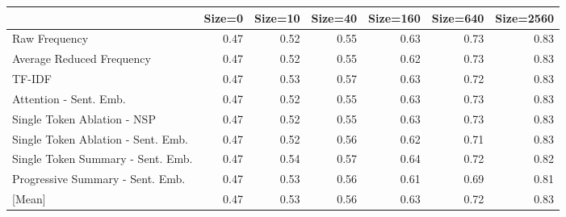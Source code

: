 \begin{tabular}{lrrrrrr}
\toprule
 & Size=0 & Size=10 & Size=40 & Size=160 & Size=640 & Size=2560 \\
\midrule
Raw Frequency & \cellcolor[RGB]{58,76,192}0.47 & \cellcolor[RGB]{101,134,236}0.52 & \cellcolor[RGB]{130,165,251}0.55 & \cellcolor[RGB]{205,217,236}0.63 & \cellcolor[RGB]{246,164,134}0.73 & \cellcolor[RGB]{179,3,38}0.83 \\
Average Reduced Frequency & \cellcolor[RGB]{58,76,192}0.47 & \cellcolor[RGB]{101,134,236}0.52 & \cellcolor[RGB]{130,165,251}0.55 & \cellcolor[RGB]{197,213,242}0.62 & \cellcolor[RGB]{246,164,134}0.73 & \cellcolor[RGB]{179,3,38}0.83 \\
TF-IDF & \cellcolor[RGB]{58,76,192}0.47 & \cellcolor[RGB]{111,145,242}0.53 & \cellcolor[RGB]{151,184,254}0.57 & \cellcolor[RGB]{205,217,236}0.63 & \cellcolor[RGB]{247,174,145}0.72 & \cellcolor[RGB]{179,3,38}0.83 \\
Attention - Sent. Emb. & \cellcolor[RGB]{58,76,192}0.47 & \cellcolor[RGB]{101,134,236}0.52 & \cellcolor[RGB]{130,165,251}0.55 & \cellcolor[RGB]{205,217,236}0.63 & \cellcolor[RGB]{246,164,134}0.73 & \cellcolor[RGB]{179,3,38}0.83 \\
Single Token Ablation - NSP & \cellcolor[RGB]{58,76,192}0.47 & \cellcolor[RGB]{101,134,236}0.52 & \cellcolor[RGB]{130,165,251}0.55 & \cellcolor[RGB]{205,217,236}0.63 & \cellcolor[RGB]{246,164,134}0.73 & \cellcolor[RGB]{179,3,38}0.83 \\
Single Token Ablation - Sent. Emb. & \cellcolor[RGB]{58,76,192}0.47 & \cellcolor[RGB]{101,134,236}0.52 & \cellcolor[RGB]{141,175,253}0.56 & \cellcolor[RGB]{197,213,242}0.62 & \cellcolor[RGB]{246,183,156}0.71 & \cellcolor[RGB]{179,3,38}0.83 \\
Single Token Summary - Sent. Emb. & \cellcolor[RGB]{58,76,192}0.47 & \cellcolor[RGB]{120,155,247}0.54 & \cellcolor[RGB]{151,184,254}0.57 & \cellcolor[RGB]{213,219,229}0.64 & \cellcolor[RGB]{247,174,145}0.72 & \cellcolor[RGB]{190,35,45}0.82 \\
Progressive Summary - Sent. Emb. & \cellcolor[RGB]{58,76,192}0.47 & \cellcolor[RGB]{111,145,242}0.53 & \cellcolor[RGB]{141,175,253}0.56 & \cellcolor[RGB]{188,209,246}0.61 & \cellcolor[RGB]{242,199,178}0.69 & \cellcolor[RGB]{200,56,53}0.81 \\
\midrule
{[Mean]} & \cellcolor[RGB]{58,76,192}0.47 & \cellcolor[RGB]{107,141,240}0.53 & \cellcolor[RGB]{138,173,253}0.56 & \cellcolor[RGB]{202,216,238}0.63 & \cellcolor[RGB]{247,174,145}0.72 & \cellcolor[RGB]{182,13,40}0.83 \\
\bottomrule
\end{tabular}